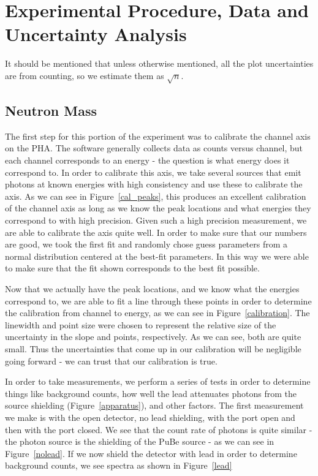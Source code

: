 \documentclass{article}
\begin{document}
\section{Experimental Procedure, Data and Uncertainty Analysis}
  It should be mentioned that unless otherwise mentioned, all the plot uncertainties are from counting, so we estimate them as $\sqrt{n}$.
  \subsection{Neutron Mass}
  The first step for this portion of the experiment was to calibrate the channel axis on the PHA.  The software generally collects data as counts versus channel, but each channel corresponds to an energy - the question is what energy does it correspond to.  In order to calibrate this axis, we take several sources that emit photons at known energies with high consistency and use these to calibrate the axis.  As we can see in Figure~\ref{cal_peaks}, this produces an excellent calibration of the channel axis as long as we know the peak locations and what energies they correspond to with high precision.  Given such a high precision measurement, we are able to calibrate the axis quite well.  In order to make sure that our numbers are good, we took the first fit and randomly chose guess parameters from a normal distribution centered at the best-fit parameters.  In this way we were able to make sure that the fit shown corresponds to the best fit possible.

  \hspace{.25cm}

  Now that we actually have the peak locations, and we know what the energies correspond to, we are able to fit a line through these points in order to determine the calibration from channel to energy, as we can see in Figure~\ref{calibration}.  The linewidth and point size were chosen to represent the relative size of the uncertainty in the slope and points, respectively.  As we can see, both are quite small.  Thus the uncertainties that come up in our calibration will be negligible going forward - we can trust that our calibration is true.

  \hspace{.25cm}

  In order to take measurements, we perform a series of tests in order to determine things like background counts, how well the lead attenuates photons from the source shielding (Figure~\ref{apparatus}), and other factors.  The first measurement we make is with the open detector, no lead shielding, with the port open and then with the port closed.  We see that the count rate of photons is quite similar - the photon source is the shielding of the PuBe source - as we can see in Figure~\ref{nolead}.  If we now shield the detector with lead in order to determine background counts, we see spectra as shown in Figure~\ref{lead}
\end{document}
